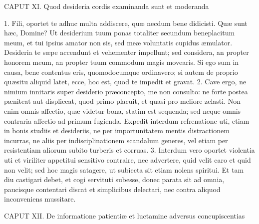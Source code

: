 CAPUT XI.
Quod desideria cordis examinanda sunt et moderanda

1. Fili, oportet te adhuc multa addiscere, quæ necdum bene didicisti.
Quæ sunt hæc, Domine?
Ut desiderium tuum ponas totaliter secundum beneplacitum meum, et tui ipsius amator non sis, sed meæ voluntatis cupidus æmulator. Desideria te sæpe accendunt et vehementer impellunt; sed considera, an propter honorem meum, an propter tuum commodum magis movearis. Si ego sum in causa, bene contentus eris, quomodocumque ordinavero; si autem de proprio quæsitu aliquid latet, ecce, hoc est, quod te impedit et gravat.
2. Cave ergo, ne nimium innitaris super desiderio præconcepto, me non consulto: ne forte postea pæniteat aut displiceat, quod primo placuit, et quasi pro meliore zelasti. Non enim omnis affectio, quæ videtur bona, statim est sequenda; sed neque omnis contraria affectio ad primum fugienda. Expedit interdum refrenatione uti, etiam in bonis studiis et desideriis, ne per importunitatem mentis distractionem incurras, ne aliis per indisciplinationem scandalum generes, vel etiam per resistentiam aliorum subito turberis et corruas.
3. Interdum vero oportet violentia uti et viriliter appetitui sensitivo contraire, nec advertere, quid velit caro et quid non velit; sed hoc magis satagere, ut subiecta sit etiam nolens spiritui. Et tam diu castigari debet, et cogi servituti subesse, donec parata sit ad omnia, paucisque contentari discat et simplicibus delectari, nec contra aliquod inconveniens mussitare.


CAPUT XII.
De informatione patientiæ et luctamine adversus concupiscentias

